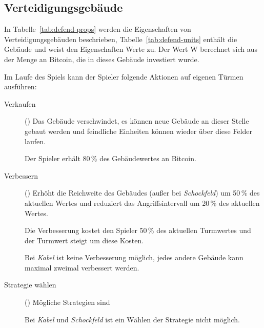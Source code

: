 \subsection{Verteidigungsgebäude}

In Tabelle~\ref{tab:defend-props} werden die Eigenschaften von
Verteidigungsgebäuden beschrieben, Tabelle~\ref{tab:defend-units} enthält die
Gebäude und weist den Eigenschaften Werte zu. Der Wert W berechnet sich aus der
Menge an Bitcoin, die in dieses Gebäude investiert wurde.

Im Laufe des Spiels kann der Spieler folgende Aktionen auf eigenen Türmen
ausführen:

\begin{description}
  \item[Verkaufen] () Das Gebäude verschwindet, es können
    neue Gebäude an dieser Stelle gebaut werden und feindliche Einheiten können
    wieder über diese Felder laufen.

    Der Spieler erhält 80\,\% des Gebäudewertes an Bitcoin.

  \item[Verbessern] () Erhöht die Reichweite des
    Gebäudes (außer bei \emph{Schockfeld}) um 50\,\% des aktuellen Wertes und
    reduziert das Angriffsintervall um 20\,\% des aktuellen Wertes.

    Die Verbesserung kostet den Spieler 50\,\% des aktuellen Turmwertes und der
    Turmwert steigt um diese Kosten.

    Bei \emph{Kabel} ist keine Verbesserung möglich, jedes andere Gebäude kann
    maximal zweimal verbessert werden.

  \item[Strategie wählen] () Mögliche Strategien sind

    Bei \emph{Kabel} und \emph{Schockfeld} ist ein Wählen der Strategie nicht
    möglich.

\end{description}


